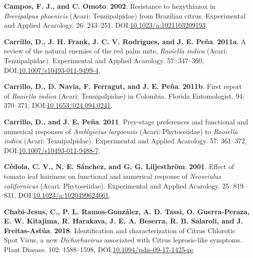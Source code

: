 \documentclass[12pt,final,CPage]{ufthesis}
\newlength{\cslhangindent}
\newenvironment{CSLReferences}[2] %
{%
	\setlength{\parindent}{0pt}
	\ifodd #1 \everypar{\setlength{\hangindent}{\cslhangindent}}\ignorespaces\fi
	\ifnum #2 > 0
	\setlength{\parskip}{#2\baselineskip}
	\fi
}%
{}
\begin{document}
{\begin{CSLReferences}{1}{0}
  \leavevmode{}%
  \textbf{Campos, F. J., and C. Omoto}. \textbf{2002}. Resistance to hexythiazox in {\emph{Brevipalpus phoenicis}} ({Acari}: {Tenuipalpidae}) from {Brazilian} citrus. Experimental and Applied Acarology. 26: 243--251, DOI:\href{https://doi.org/10.1023/a:1021103209193}{10.1023/a:1021103209193}.

  \leavevmode{}%
  \textbf{Carrillo, D., J. H. Frank, J. C. V. Rodrigues, and J. E. Peña}. \textbf{2011a}. A review of the natural enemies of the red palm mite, {\emph{Raoiella indica}} ({Acari}: {Tenuipalpidae}). Experimental and Applied Acarology. 57: 347--360, DOI:\href{https://doi.org/10.1007/s10493-011-9499-4}{10.1007/s10493-011-9499-4}.

  \leavevmode{}%
  \textbf{Carrillo, D., D. Navia, F. Ferragut, and J. E. Peña}. \textbf{2011b}. First report of {\emph{Raoiella indica}} ({Acari}: {Tenuipalpidae}) in {Colombia}. Florida Entomologist. 94: 370--371, DOI:\href{https://doi.org/10.1653/024.094.0241}{10.1653/024.094.0241}.

  \leavevmode{}%
  \textbf{Carrillo, D., and J. E. Peña}. \textbf{2011}. Prey-stage preferences and functional and numerical responses of {\emph{Amblyseius largoensis}} ({Acari: Phytoseiidae}) to {\emph{Raoiella indica}} ({Acari}: {Tenuipalpidae}). Experimental and Applied Acarology. 57: 361--372, DOI:\href{https://doi.org/10.1007/s10493-011-9488-7}{10.1007/s10493-011-9488-7}.

  \leavevmode{}%
  \textbf{Cédola, C. V., N. E. Sánchez, and G. G. Liljesthröm}. \textbf{2001}. Effect of tomato leaf hairiness on functional and numerical response of {\emph{Neoseiulus californicus}} ({Acari}: {Phytoseiidae}). Experimental and Applied Acarology. 25: 819--831, DOI:\href{https://doi.org/10.1023/a:1020499624661}{10.1023/a:1020499624661}.

  \leavevmode{}%
  \textbf{Chabi-Jesus, C., P. L. Ramos-González, A. D. Tassi, O. Guerra-Peraza, E. W. Kitajima, R. Harakava, J. E. A. Beserra, R. B. Salaroli, and J. Freitas-Astúa}. \textbf{2018}. Identification and characterization of {Citrus Chlorotic Spot Virus}, a new {\emph{Dichorhavirus}} associated with {Citrus leprosis}-like symptoms. Plant Disease. 102: 1588--1598, DOI:\href{https://doi.org/10.1094/pdis-09-17-1425-re}{10.1094/pdis-09-17-1425-re}.


\end{CSLReferences}}
\end{document}
